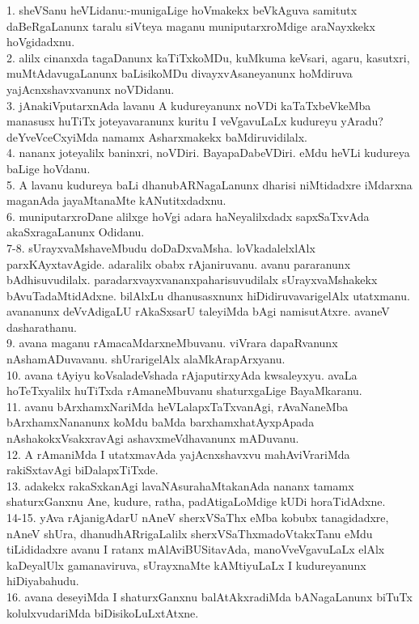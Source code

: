 \documentclass{article}
\begin{document}
1. sheVSanu heVLidanu:-munigaLige hoVmakekx beVkAguva samitutx daBeRgaLanunx taralu siVteya maganu muniputarxroMdige araNayxkekx hoVgidadxnu.\\
2. alilx cinanxda tagaDanunx kaTiTxkoMDu, kuMkuma keVsari, agaru, kasutxri, muMtAdavugaLanunx baLisikoMDu divayxvAsaneyanunx hoMdiruva yajAcnxshavxvanunx noVDidanu.\\
3. jAnakiVputarxnAda lavanu A kudureyanunx noVDi kaTaTxbeVkeMba manasusx huTiTx joteyavaranunx kuritu I veVgavuLaLx kudureyu yAradu? deYveVceCxyiMda namamx Asharxmakekx baMdiruvidilalx.\\
4. nananx joteyalilx baninxri, noVDiri. BayapaDabeVDiri. eMdu heVLi kudureya baLige hoVdanu.\\
5. A lavanu kudureya baLi dhanubARNagaLanunx dharisi niMtidadxre iMdarxna maganAda jayaMtanaMte kANutitxdadxnu.\\
6. muniputarxroDane alilxge hoVgi adara haNeyalilxdadx sapxSaTxvAda akaSxragaLanunx Odidanu.\\
7-8. sUrayxvaMshaveMbudu doDaDxvaMsha. loVkadalelxlAlx parxKAyxtavAgide. adaralilx obabx rAjaniruvanu. avanu pararanunx bAdhisuvudilalx. paradarxvayxvananxpaharisuvudilalx sUrayxvaMshakekx bAvuTadaMtidAdxne. bilAlxLu dhanusasxnunx hiDidiruvavarigelAlx utatxmanu. avananunx deVvAdigaLU rAkaSxsarU taleyiMda bAgi namisutAtxre. avaneV dasharathanu.\\
9. avana maganu rAmacaMdarxneMbuvanu. viVrara dapaRvanunx nAshamADuvavanu. shUrarigelAlx alaMkArapArxyanu.\\
10. avana tAyiyu koVsaladeVshada rAjaputirxyAda kwsaleyxyu. avaLa hoTeTxyalilx huTiTxda rAmaneMbuvanu shaturxgaLige BayaMkaranu.\\
11. avanu bArxhamxNariMda heVLalapxTaTxvanAgi, rAvaNaneMba bArxhamxNananunx koMdu baMda barxhamxhatAyxpApada nAshakokxVsakxravAgi ashavxmeVdhavanunx mADuvanu.\\
12. A rAmaniMda I utatxmavAda yajAcnxshavxvu mahAviVrariMda rakiSxtavAgi biDalapxTiTxde.\\
13. adakekx rakaSxkanAgi lavaNAsurahaMtakanAda nananx tamamx shaturxGanxnu Ane, kudure, ratha, padAtigaLoMdige kUDi horaTidAdxne.\\
14-15. yAva rAjanigAdarU nAneV sherxVSaThx eMba kobubx tanagidadxre, nAneV shUra, dhanudhARrigaLalilx sherxVSaThxmadoVtakxTanu eMdu tiLididadxre avanu I ratanx mAlAviBUSitavAda, manoVveVgavuLaLx elAlx kaDeyalUlx gamanaviruva, sUrayxnaMte kAMtiyuLaLx I kudureyanunx hiDiyabahudu.\\
16. avana deseyiMda I shaturxGanxnu balAtAkxradiMda bANagaLanunx biTuTx kolulxvudariMda biDisikoLuLxtAtxne.\\
\end{document}
